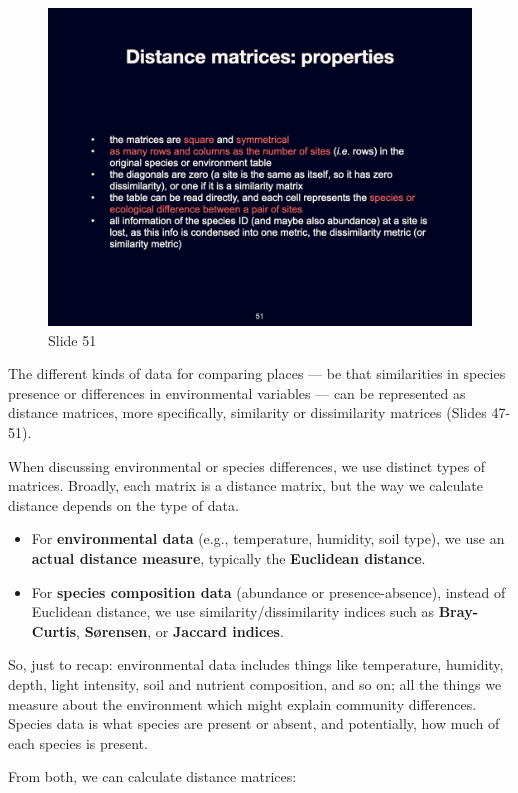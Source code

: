 \documentclass[
  11pt,
]{book}
\providecommand{\tightlist}{%
  \setlength{\itemsep}{0pt}\setlength{\parskip}{0pt}}
\begin{document}
\begin{figure}[ht]
\centering
\includegraphics[width=0.8\linewidth]{../images/BDC334/BDC334-051.jpeg}
\caption*{Slide 51}
\end{figure}

The different kinds of data for comparing places --- be that
similarities in species presence or differences in environmental
variables --- can be represented as distance matrices, more
specifically, similarity or dissimilarity matrices (Slides 47-51).

When discussing environmental or species differences, we use distinct
types of matrices. Broadly, each matrix is a distance matrix, but the
way we calculate distance depends on the type of data.

\begin{itemize}
\tightlist
\item
  For \textbf{environmental data} (e.g., temperature, humidity, soil
  type), we use an \textbf{actual distance measure}, typically the
  \textbf{Euclidean distance}.
\item
  For \textbf{species composition data} (abundance or presence-absence),
  instead of Euclidean distance, we use similarity/dissimilarity indices
  such as \textbf{Bray-Curtis}, \textbf{Sørensen}, or \textbf{Jaccard
  indices}.
\end{itemize}

So, just to recap: environmental data includes things like temperature,
humidity, depth, light intensity, soil and nutrient composition, and so
on; all the things we measure about the environment which might explain
community differences. Species data is what species are present or
absent, and potentially, how much of each species is present.

From both, we can calculate distance matrices:
\end{document}
